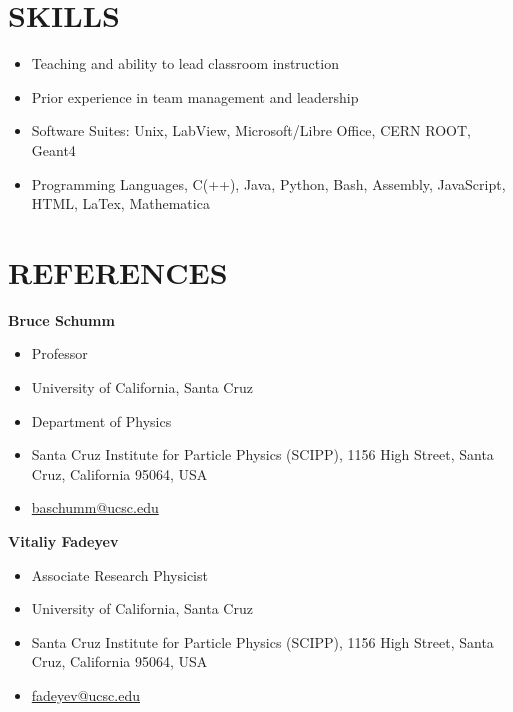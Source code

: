 \documentclass[paper=a4,fontsize=11pt]{scrartcl} %
\newcommand{\sepspace}{\vspace*{1em}}		%
\newcommand{\NewPart}[1]{\section*{\uppercase{#1}}}
\begin{document}
\NewPart{Skills}{}
    \begin{itemize}[itemsep=-3pt]
        \item Teaching and ability to lead classroom instruction
        \item Prior experience in team management and leadership
        \item Software Suites: Unix, LabView, Microsoft/Libre Office, CERN ROOT, Geant4
        \item Programming Languages, C(++), Java, Python, Bash, Assembly, JavaScript, HTML, LaTex, Mathematica
    \end{itemize}





\NewPart{References}{}
    \textbf{Bruce Schumm}
    \begin{itemize}[itemsep=-5pt]
        \item[] Professor
        \item[] University of California, Santa Cruz
        \item[] Department of Physics
        \item[] Santa Cruz Institute for Particle Physics (SCIPP),
         1156 High Street, Santa Cruz, California 95064, USA
        \item[] \href{mailto:baschumm@ucsc.edu} {baschumm@ucsc.edu}
    \end{itemize}

    \sepspace

    \textbf{Vitaliy Fadeyev}
    \begin{itemize}[itemsep=-5pt]
        \item[] Associate Research Physicist
        \item[] University of California, Santa Cruz
        \item[] Santa Cruz Institute for Particle Physics (SCIPP),
         1156 High Street, Santa Cruz, California 95064, USA
        \item[] \href{mailto:fadeyev@ucsc.edu} {fadeyev@ucsc.edu}
    \end{itemize}
\end{document}
